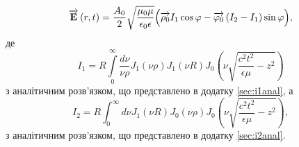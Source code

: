 %
\begin{equation} \label{eq:linear_e_cyl}
\overrightarrow{\mathbf E} \left( r, t \right) = \frac{A_0}{2} 
\sqrt{\frac{\mu_0 \mu}{\epsilon_0 \epsilon}}
\Big( \overrightarrow{\mathbf \rho_0} I_1 \cos \varphi - 
\overrightarrow{\mathbf  \varphi_0 } \left( I_2 - I_1 \right) \sin \varphi \Big),
\end{equation}
%
де
%
\begin{equation*}
I_1 = R \int \limits_{0}^{\infty} \frac{d \nu}{\nu \rho} J_1 (\nu \rho) 
J_1 (\nu R) J_0 \left( \nu \sqrt{\frac{c^2 t^2}{\epsilon \mu} - z^2} \right)
\end{equation*}
з аналітичним розв'язком, що представлено в додатку \ref{sec:i1anal}, а
%
\begin{equation*}
I_2 = R \int_{0}^{\infty} d \nu J_1 (\nu R) J_0 (\nu \rho) 
J_0 \left( \nu \sqrt{\frac{c^2 t^2}{\epsilon \mu} - z^2} \right),
\end{equation*}
%
з аналітичним розв'язком, що представлено в додатку \ref{sec:i2anal}.

